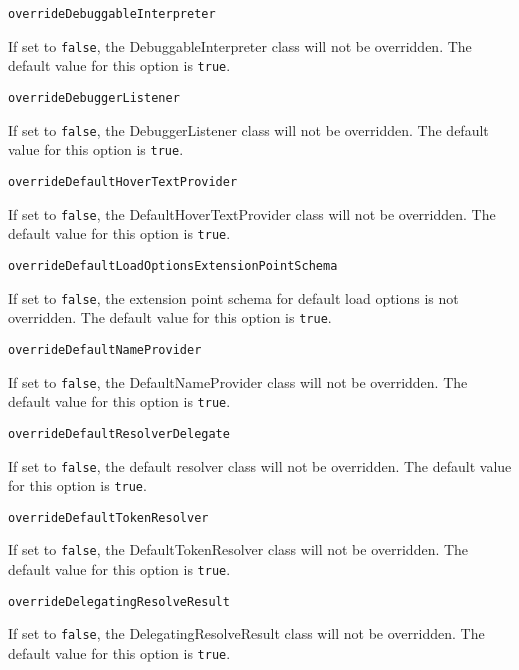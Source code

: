 \noindent\texttt{overrideDebuggableInterpreter}
\begin{myindentpar}{1cm}
If set to \texttt{false}, the DebuggableInterpreter class will not be overridden. The default value for this option is \texttt{true}.
\end{myindentpar}

\noindent\texttt{overrideDebuggerListener}
\begin{myindentpar}{1cm}
If set to \texttt{false}, the DebuggerListener class will not be overridden. The default value for this option is \texttt{true}.
\end{myindentpar}

\noindent\texttt{overrideDefaultHoverTextProvider}
\begin{myindentpar}{1cm}
If set to \texttt{false}, the DefaultHoverTextProvider class will not be overridden. The default value for this option is \texttt{true}.
\end{myindentpar}

\noindent\texttt{overrideDefaultLoadOptionsExtensionPointSchema}
\begin{myindentpar}{1cm}
If set to \texttt{false}, the extension point schema for default load options is not overridden. The default value for this option is \texttt{true}.
\end{myindentpar}

\noindent\texttt{overrideDefaultNameProvider}
\begin{myindentpar}{1cm}
If set to \texttt{false}, the DefaultNameProvider class will not be overridden. The default value for this option is \texttt{true}.
\end{myindentpar}

\noindent\texttt{overrideDefaultResolverDelegate}
\begin{myindentpar}{1cm}
If set to \texttt{false}, the default resolver class will not be overridden. The default value for this option is \texttt{true}.
\end{myindentpar}

\noindent\texttt{overrideDefaultTokenResolver}
\begin{myindentpar}{1cm}
If set to \texttt{false}, the DefaultTokenResolver class will not be overridden. The default value for this option is \texttt{true}.
\end{myindentpar}

\noindent\texttt{overrideDelegatingResolveResult}
\begin{myindentpar}{1cm}
If set to \texttt{false}, the DelegatingResolveResult class will not be overridden. The default value for this option is \texttt{true}.
\end{myindentpar}

